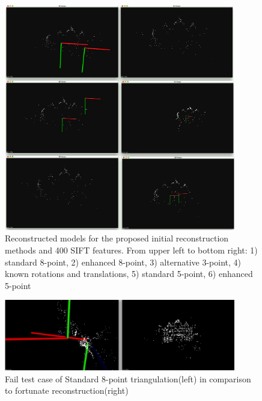 \begin{figure}[t!]
    \centering
    \includegraphics[width=0.9\textwidth]{uni400Comparison}
    \caption{Reconstructed models for the proposed initial reconstruction methods and 400 SIFT features. From upper left to bottom right: 1) standard 8-point, 2) enhanced 8-point, 3) alternative 3-point, 4) known rotations and translations, 5) standard 5-point, 6) enhanced 5-point}
    \label{fig:uni400Comparison}
\end{figure}
\begin{figure}[p]
    \centering
    \includegraphics[width=0.9\textwidth]{FailCaseFundamental}
    \caption{Fail test case of Standard 8-point triangulation(left) in comparison to fortunate reconstruction(right)}
    \label{fig:FailCaseFundamental}
\end{figure}
